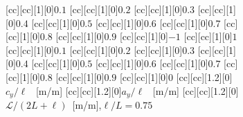 \begin{figure}[h!]\ContinuedFloat
\centering
\begin{subfigure}[h]{0.8\textwidth}
[cc][cc][1][0]{$0.1$}
[cc][cc][1][0]{$0.2$}
[cc][cc][1][0]{$0.3$}
[cc][cc][1][0]{$0.4$}
[cc][cc][1][0]{$0.5$}
[cc][cc][1][0]{$0.6$}
[cc][cc][1][0]{$0.7$}
[cc][cc][1][0]{$0.8$}
[cc][cc][1][0]{$0.9$}
[cc][cc][1][0]{$-1$}
[cc][cc][1][0]{$1$}
[cc][cc][1][0]{$0.1$}
[cc][cc][1][0]{$0.2$}
[cc][cc][1][0]{$0.3$}
[cc][cc][1][0]{$0.4$}
[cc][cc][1][0]{$0.5$}
[cc][cc][1][0]{$0.6$}
[cc][cc][1][0]{$0.7$}
[cc][cc][1][0]{$0.8$}
[cc][cc][1][0]{$0.9$}
[cc][cc][1][0]{$0$}
[cc][cc][1.2][0]{$c_y/\ell$ \ [m/m]}
[cc][cc][1.2][0]{$a_y/\ell$ \ [m/m]}
[cc][cc][1.2][0]{$\mathcal{L}/(2L+\ell)$\ [m/m],\quad $\ell/L =0.75$}
\caption{}
\end{subfigure}


\end{figure}
